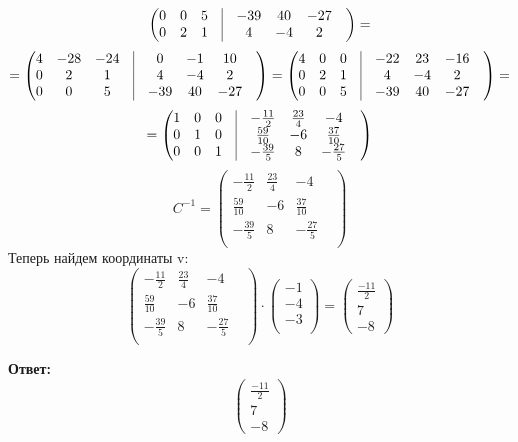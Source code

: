 \documentclass[a4paper,12pt]{article}
\begin{document}
\begin{enumerate}
\[\begin{pmatrix}
0 & 0 & 5 & \vrule &-39 & 40 & -27 & \\
0 & 2 & 1 & \vrule &4 & -4 & 2 & \\
\end{pmatrix}
=
\]
\[
=
\begin{pmatrix}
4 & -28 & -24 & \vrule &0 & -1 & 10 & \\
0 & 2 & 1 & \vrule &4 & -4 & 2 & \\
0 & 0 & 5 & \vrule &-39 & 40 & -27 & \\
\end{pmatrix}
=
\begin{pmatrix}
4 & 0 & 0 & \vrule &-22 & 23 & -16 & \\
0 & 2 & 1 & \vrule &4 & -4 & 2 & \\
0 & 0 & 5 & \vrule &-39 & 40 & -27 & \\
\end{pmatrix}
=
\]
\[
=
\begin{pmatrix}
1 & 0 & 0 & \vrule &-\frac{11}{2} & \frac{23}{4} & -4 & \\
0 & 1 & 0 & \vrule &\frac{59}{10}& -6 & \frac{37}{10} & \\
0 & 0 & 1& \vrule &-\frac{39}{5} & 8 & -\frac{27}{5}& \\
\end{pmatrix}
\]
\[
C^{-1} = 
\begin{pmatrix}
-\frac{11}{2} & \frac{23}{4} & -4 & \\
\frac{59}{10}& -6 & \frac{37}{10} & \\
-\frac{39}{5} & 8 & -\frac{27}{5}& \\
\end{pmatrix}
\]
Теперь найдем координаты v:
\[
\begin{pmatrix}
-\frac{11}{2} & \frac{23}{4} & -4 & \\
\frac{59}{10}& -6 & \frac{37}{10} & \\
-\frac{39}{5} & 8 & -\frac{27}{5}& \\
\end{pmatrix}
\cdot
\begin{pmatrix}
-1 \\
-4 \\
-3 \\
\end{pmatrix}
=
\left(\begin{matrix}
\frac{-11}{2} \\
7 \\
-8
\end{matrix}\right)
\]
\end{enumerate}
{\LARGE \begin{center}
\textbf{Ответ: } 
\[
\left(\begin{matrix}
\frac{-11}{2} \\
7 \\
-8
\end{matrix}\right)
\]
\end{center}}
\clearpage
\end{document}
